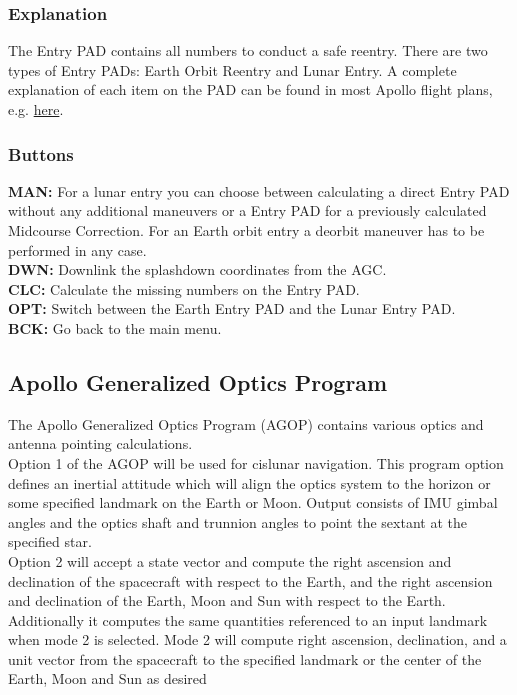 \documentclass[11pt]{article} %
\begin{document}
\subsubsection{Explanation}

The Entry PAD contains all numbers to conduct a safe reentry. There are two types of Entry PADs: Earth Orbit Reentry and Lunar Entry. A complete explanation of each item on the PAD can be found in most Apollo flight plans, e.g. \href{http://history.nasa.gov/alsj/a11/a11fltpln_final_reformat.pdf}{here}. \\

\subsubsection{Buttons}

\textbf{MAN:} For a lunar entry you can choose between calculating a direct Entry PAD without any additional maneuvers or a Entry PAD for a previously calculated Midcourse Correction. For an Earth orbit entry a deorbit maneuver has to be performed in any case.\\
\textbf{DWN:} Downlink the splashdown coordinates from the AGC.\\
\textbf{CLC:} Calculate the missing numbers on the Entry PAD.\\
\textbf{OPT:} Switch between the Earth Entry PAD and the Lunar Entry PAD.\\
\textbf{BCK:} Go back to the main menu.\\
\newpage
\subsection{Apollo Generalized Optics Program}

The Apollo Generalized Optics Program (AGOP) contains various optics and antenna pointing calculations.\\

Option 1 of the AGOP will be used for cislunar navigation. This program option defines an inertial attitude which will align the optics system to the horizon or some specified landmark on the Earth or Moon. Output consists of IMU gimbal angles and the optics shaft and trunnion angles to point the sextant at the specified star.\\

Option 2 will accept a state vector and compute the right ascension and declination of the spacecraft with respect to the Earth, and the right ascension and declination of the Earth, Moon and Sun with respect to the Earth. Additionally it computes the same quantities referenced to an input landmark when mode 2 is selected. Mode 2 will compute right ascension, declination, and a unit vector from the spacecraft to the specified landmark or the center of the Earth, Moon and Sun as desired\\
\end{document}
